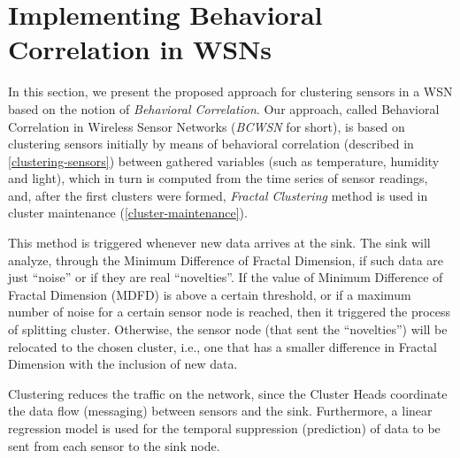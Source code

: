 \documentclass{acm_proc_article-sp}
\begin{document}
\section{Implementing Behavioral Correlation in WSNs}
\label{implementing-bcwsn}

In this section, we present the proposed approach for clustering sensors in a
WSN based on the notion of {\it Behavioral Correlation}. Our approach, called
Behavioral Correlation in Wireless Sensor Networks (\textit{BCWSN} for short),
is based on clustering sensors initially by means of behavioral correlation
(described in \ref{clustering-sensors}) between gathered variables (such as
temperature, humidity and light), which in turn is computed from the time series
of sensor readings, and, after the first clusters were formed, \textit{Fractal
Clustering} method is used in cluster maintenance (\ref{cluster-maintenance}).

This method is triggered whenever new data arrives at the sink.
The sink will analyze, through the Minimum Difference of Fractal Dimension, if
such data are just ``noise'' or if they are real ``novelties''. If the value of
Minimum Difference of Fractal Dimension (MDFD) is above a certain threshold, or
if a maximum number of noise for a certain sensor node is reached, then it
triggered the process of splitting cluster. Otherwise, the sensor node (that
sent the ``novelties'') will be relocated to the chosen cluster, i.e., one that
has a smaller difference in Fractal Dimension with the inclusion of new data.

Clustering reduces the traffic on the network, since the Cluster Heads
coordinate the data flow (messaging) between sensors and the sink.
Furthermore, a linear regression model is used for the temporal suppression
(prediction) of data to be sent from each sensor to the sink node.
\end{document}
